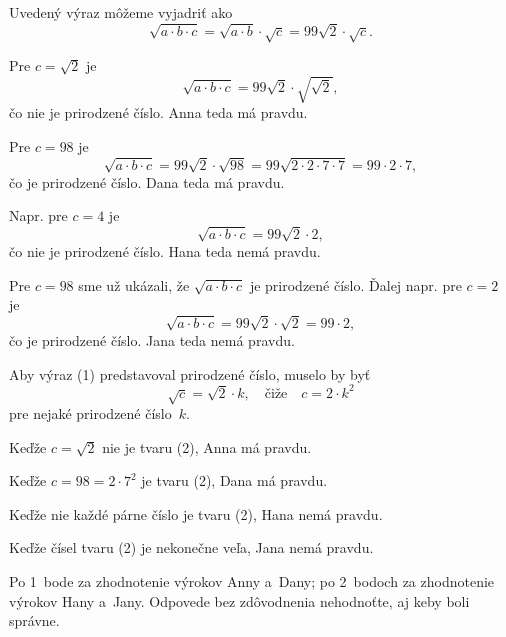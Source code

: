 {%
Uvedený výraz môžeme vyjadriť ako
$$
\sqrt{a\cdot b\cdot c}=\sqrt{a\cdot b}\cdot\sqrt{c}=99\sqrt2\cdot\sqrt{c}.
\tag{1}
$$

Pre $c=\sqrt2$ je
$$\sqrt{a\cdot b\cdot c} =99\sqrt2\cdot\sqrt{\sqrt{2}},
$$
čo nie je prirodzené číslo.
Anna teda má pravdu.

Pre $c=98$ je
$$\sqrt{a\cdot b\cdot c} =99\sqrt2\cdot\sqrt{98} =99\sqrt{2\cdot2\cdot7\cdot7} =99\cdot2\cdot7,
$$
čo je prirodzené číslo.
Dana teda má pravdu.

Napr. pre $c=4$ je
$$\sqrt{a\cdot b\cdot c} =99\sqrt2\cdot2,
$$
čo nie je prirodzené číslo.
Hana teda nemá pravdu.

Pre $c=98$ sme už ukázali, že $\sqrt{a\cdot b\cdot c}$ je prirodzené číslo.
Ďalej napr. pre $c=2$ je
$$\sqrt{a\cdot b\cdot c} =99\sqrt2\cdot\sqrt2 =99\cdot2,
$$
čo je prirodzené číslo.
Jana teda nemá pravdu.

\ineriesenie
Aby výraz (1) predstavoval prirodzené číslo, muselo by byť
$$
\sqrt{c}=\sqrt2\cdot k,
\quad\text{čiže}\quad
c=2\cdot k^2
\tag{2}
$$
pre nejaké prirodzené číslo~$k$.

Keďže $c=\sqrt2$ nie je tvaru (2), Anna má pravdu.

Keďže $c=98=2\cdot 7^2$ je tvaru (2), Dana má pravdu.

Keďže nie každé párne číslo je tvaru (2),
Hana nemá pravdu.

Keďže čísel tvaru (2) je nekonečne veľa, Jana nemá pravdu.

\hodnotenie
Po 1~bode za zhodnotenie výrokov Anny a~Dany;
po 2~bodoch za zhodnotenie výrokov Hany a~Jany.
Odpovede bez zdôvodnenia nehodnoťte, aj keby boli správne.
\endhodnotenie
}

